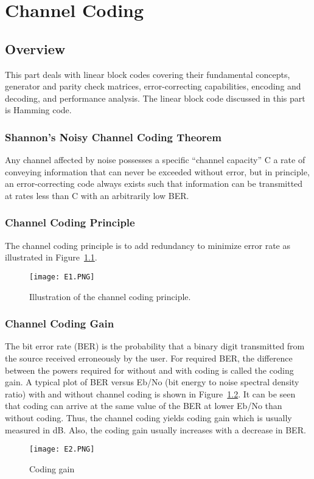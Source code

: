 \chapter{Channel Coding}

\section{Overview}
This part deals with linear block codes covering their fundamental concepts, generator and parity check matrices, error-correcting capabilities, encoding and decoding, and performance analysis. The linear block code discussed in this part is Hamming code.

\subsection{Shannon's Noisy Channel Coding Theorem}
Any channel affected by noise possesses a specific “channel capacity” C a rate of conveying information that can never be exceeded without error, but in principle, an error-correcting code always exists such that information can be transmitted at rates less than C with an arbitrarily low BER.

\subsection{Channel Coding Principle}
The channel coding principle is to add redundancy to minimize error rate as illustrated in Figure~\ref{fig:channel coding principle}.
\begin{figure}[ht]
    \centering
    \texttt{[image: E1.PNG]}
    \caption{Illustration of the channel coding principle.}
    \label{fig:channel coding principle}
\end{figure}

\subsection{Channel Coding Gain}
The bit error rate (BER) is the probability that a binary digit transmitted from the source received erroneously by the user. For required BER, the difference between the powers required for without and with coding is called the coding gain. A typical plot of BER versus Eb/No (bit energy to noise spectral density ratio) with and without channel coding is shown in Figure~\ref{fig:Coding gain}. It can be seen that coding can arrive at the same value of the BER at lower Eb/No than without coding. Thus, the channel coding yields coding gain which is usually measured in dB. Also, the coding gain usually increases with a decrease in BER.
\begin{figure}[ht]
    \centering
    \texttt{[image: E2.PNG]}
    \caption{Coding gain}
    \label{fig:Coding gain}
\end{figure}

